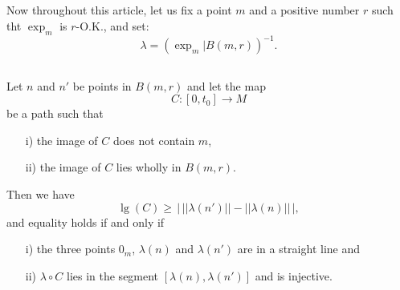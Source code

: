 \setcounter{subsection}{4}
\subsection{}\label{chap7:7.1.5}
Now throughout this article, let us fix a point $m$ and a positive
number $r$ such tht $\exp_{m}$ is $r$-O.K., and set:
$$
\lambda=(\exp_{m}|B(m,r))^{-1}.
$$

\setcounter{subsection}{5}

\subsection{}\label{chap7:7.1.6}

\begin{lemma*}
Let $n$ and $n'$ be points in $B(m,r)$ and let the map
$$
C:[0,t_{0}]\to M
$$
be a path such that
\begin{itemize}
\item[\rm i)] the image of $C$ does not contain $m$,

\item[\rm ii)] the image of $C$ lies wholly in $B(m,r)$.
\end{itemize}
Then we have
$$
\lg(C)\geq \,\big|\, ||\lambda(n')||-||\lambda(n)||\,\big|,
$$
and equality holds if and only if
\begin{itemize}
\item[\rm i)] the three points $0_{m}$, $\lambda(n)$ and $\lambda(n')$
  are in a straight line and

\item[\rm ii)] $\lambda\circ C$ lies in the segment
  $[\lambda(n),\lambda(n')]$ and is injective.
\end{itemize}
\end{lemma*}

